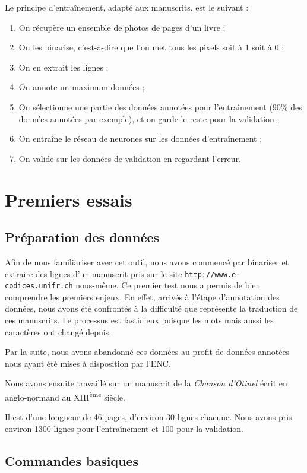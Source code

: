 \documentclass{article}
\newcommand\up{\textsuperscript}
\begin{document}
Le principe d'entraînement, adapté aux manuscrits, est le suivant : 
\begin{enumerate}[parsep=0.1cm,itemsep=0.1cm,topsep=0.1cm]
    \item On récupère un ensemble de photos de pages d'un livre ;
    \item On les binarise, c'est-à-dire que l'on met tous les pixels soit à 1 soit à 0 ;
    \item On en extrait les lignes ;
    \item On annote un maximum données ;
    \item On sélectionne une partie des données annotées pour l'entraînement (90\% des données annotées par exemple), et on garde le reste pour la validation ;
    \item On entraîne le réseau de neurones sur les données d'entraînement ;
    \item On valide sur les données de validation en regardant l'erreur.
\end{enumerate}

\section{Premiers essais}

\subsection{Préparation des données}

Afin de nous familiariser avec cet outil, nous avons commencé par binariser et extraire des lignes d'un manuscrit pris sur le site \texttt{http://www.e-codices.unifr.ch} nous-même. Ce premier test nous a permis de bien comprendre les premiers enjeux. En effet, arrivés à l'étape d'annotation des données, nous avons été confrontés à la difficulté que représente la traduction de ces manuscrits. Le processus est fastidieux puisque les mots mais aussi les caractères ont changé depuis.

Par la suite, nous avons abandonné ces données au profit de données annotées nous ayant été mises à disposition par l'ENC.

Nous avons ensuite travaillé sur un manuscrit de la \textit{Chanson d'Otinel} écrit en anglo-normand au XIII\up{ème} siècle.

Il est d'une longueur de 46 pages, d'environ 30 lignes chacune. Nous avons pris environ 1300 lignes pour l'entraînement et 100 pour la validation.

\subsection{Commandes basiques}
\end{document}
